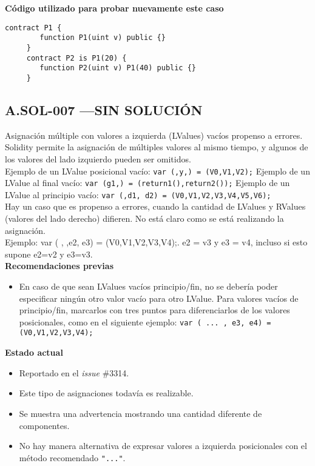 \textbf{Código utilizado para probar nuevamente este caso}
\begin{lstlisting}[language=Solidity]
    contract P1 {
        function P1(uint v) public {}
     }
     contract P2 is P1(20) {
        function P2(uint v) P1(40) public {}
     }
\end{lstlisting}
\bigskip

\subsection*{A.SOL-007  \color{BrickRed}—SIN SOLUCIÓN}
Asignación múltiple con valores a izquierda (LValues) vacíos propenso a errores.\\

Solidity permite la asignación de múltiples valores al mismo tiempo, y algunos de los valores del lado izquierdo pueden ser omitidos.\\

Ejemplo de un LValue posicional vacío: \texttt{var (,y,) = (V0,V1,V2);}
Ejemplo de un LValue al final vacío: \texttt{var (g1,) = (return1(),return2());}
Ejemplo de un LValue al principio vacío:  \texttt{var (,d1, d2) = (V0,V1,V2,V3,V4,V5,V6);}\\

Hay un caso que es propenso a errores, cuando la cantidad de LValues y RValues (valores del lado derecho) difieren. No está claro como se está realizando la asignación.\\

Ejemplo: var ( , ,e2, e3) = (V0,V1,V2,V3,V4);. e2 = v3 y e3 = v4, incluso si esto supone e2=v2 y e3=v3.\\

\textbf{Recomendaciones previas}
\begin{itemize}
    \item En caso de que sean LValues vacíos principio/fin, no se debería poder especificar ningún otro valor vacío para otro LValue. Para valores vacíos de principio/fin, marcarlos con tres puntos para diferenciarlos de los valores posicionales, como en el siguiente ejemplo:
    \texttt{var ( ... , e3, e4) = (V0,V1,V2,V3,V4);}    
\end{itemize}
\bigskip

\textbf{Estado actual}
\begin{itemize}
    \item Reportado en el \textit{issue} \#3314\cite{GHI3314}.
    \item Este tipo de asignaciones todavía es realizable. 
    \item Se muestra una advertencia mostrando una cantidad diferente de componentes. 
    \item No hay manera alternativa de expresar valores a izquierda posicionales con el método recomendado \texttt{"..."}.
\end{itemize}


